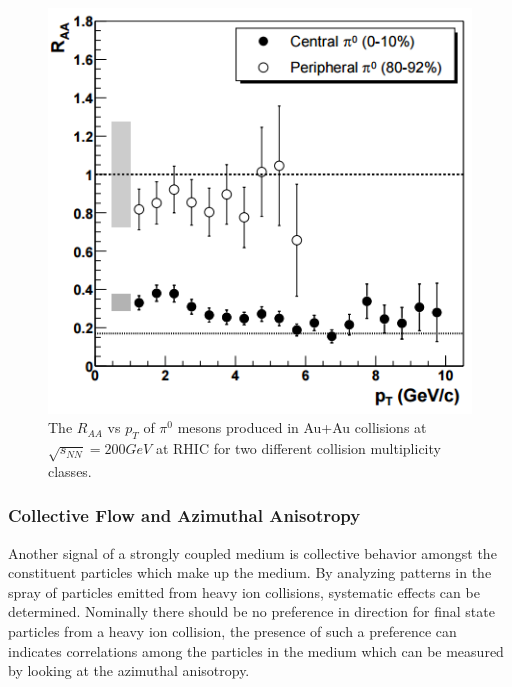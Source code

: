 \begin{figure}[!ht]
\begin{center}
\includegraphics[width=0.6\linewidth]{figs/raa_pi0_aa_cent_periph.png}
\caption{The $R_{AA}$  vs $p_T$ of $\pi^0$ mesons produced in Au+Au collisions at $\sqrt{s_{NN}} = 200 GeV$ at RHIC for two different collision multiplicity classes. ~\cite{PhysRevLett.91.072303}}
\end{center}
\label{fig:RAA_plot}
\end{figure}
\clearpage

\subsubsection{Collective Flow and Azimuthal Anisotropy}
Another signal of a strongly coupled medium is collective behavior amongst the constituent particles which make up the medium. By analyzing patterns in the spray of particles emitted from heavy ion collisions, systematic effects can be determined. Nominally there should be no preference in direction for final state particles from a heavy ion collision, the presence of such a preference can indicates correlations among the particles in the medium which can be measured by looking at the azimuthal anisotropy.

